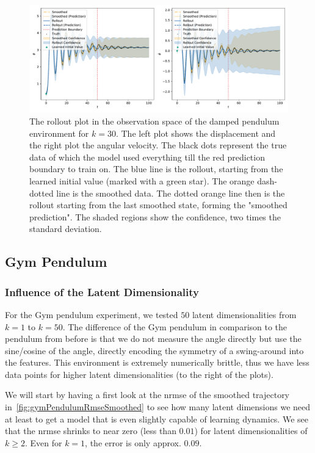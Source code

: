 			\begin{figure}
				\centering
				\includegraphics[width=\linewidth]{figures/results/pendulum-damped/run-latent-dim-30/rollout-observations-N0.pdf}
				\caption{The rollout plot in the observation space of the damped pendulum environment for \(k = 30\). The left plot shows the displacement and the right plot the angular velocity. The black dots represent the true data of which the model used everything till the red prediction boundary to train on. The blue line is the rollout, starting from the learned initial value (marked with a green star). The orange dash-dotted line is the smoothed data. The dotted orange line then is the rollout starting from the last smoothed state, forming the "smoothed prediction". The shaded regions show the confidence, \ie two times the standard deviation.}
				\label{fig:pendulumDampedRolloutL30}
			\end{figure}

	\subsection{Gym Pendulum} %
		\subsubsection{Influence of the Latent Dimensionality}
			\label{subsubsec:gymPendulumLatents}

			For the Gym pendulum experiment, we tested \(50\) latent dimensionalities from \( k = 1 \) to \( k = 50 \). The difference of the Gym pendulum in comparison to the pendulum from before is that we do not measure the angle directly but use the sine/cosine of the angle, directly encoding the symmetry of a swing-around into the features. This environment is extremely numerically brittle, thus we have less data points for higher latent dimensionalities (to the right of the plots).

			We will start by having a first look at the \ac{nrmse} of the smoothed trajectory in~\autoref{fig:gymPendulumRmseSmoothed} to see how many latent dimensions we need at least to get a model that is even slightly capable of learning dynamics. We see that the \ac{nrmse} shrinks to near zero (less than \( 0.01 \)) for latent dimensionalities of \( k \geq 2 \). Even for \( k = 1 \), the error is only approx. \( 0.09 \).

